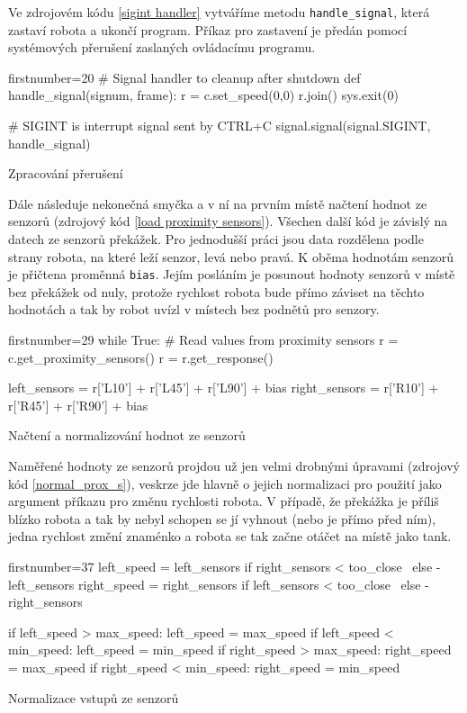 \documentclass[12pt,notitlepage]{report}
\newcommand{\code}[1]{\texttt{\small #1}}
\begin{document}
Ve zdrojovém kódu \ref{sigint handler} vytváříme metodu \code{handle\_signal},
která zastaví robota a ukončí program. Příkaz pro zastavení je předán pomocí
systémových přerušení zaslaných ovládacímu programu.

\begin{listing}[H]
\begin{pyc*}{firstnumber=20}
# Signal handler to cleanup after shutdown
def handle_signal(signum, frame):
    r = c.set_speed(0,0)
    r.join()
    sys.exit(0)

# SIGINT is interrupt signal sent by CTRL+C
signal.signal(signal.SIGINT, handle_signal)
\end{pyc*}
\caption{Zpracování přerušení}
\label{sigint handler}
\end{listing}

Dále následuje nekonečná smyčka a v ní na prvním místě načtení hodnot ze
senzorů (zdrojový kód  \ref{load proximity sensors}). Všechen další kód je
závislý na datech ze senzorů překážek. Pro jednodušší práci jsou data rozdělena
podle strany robota, na které leží senzor, levá nebo pravá. K oběma hodnotám
senzorů je přičtena proměnná \code{bias}. Jejím posláním je posunout hodnoty
senzorů v místě bez překážek od nuly, protože rychlost robota bude přímo
záviset na těchto hodnotách a tak by robot uvízl v místech bez podnětů pro
senzory.

\begin{listing}[H]
\begin{pyc*}{firstnumber=29}
while True:
    # Read values from proximity sensors
    r = c.get_proximity_sensors()
    r = r.get_response()

    left_sensors = r['L10'] + r['L45'] + r['L90'] + bias
    right_sensors = r['R10'] + r['R45'] + r['R90'] + bias
\end{pyc*}
\caption{Načtení a normalizování hodnot ze senzorů}
\label{load proximity sensors}
\end{listing}

Naměřené hodnoty ze senzorů projdou už jen velmi drobnými úpravami (zdrojový
kód \ref{normal_prox_s}), veskrze jde hlavně o jejich
normalizaci pro použití jako argument příkazu pro změnu rychlosti robota. V
případě, že překážka je příliš blízko robota a tak by nebyl schopen se jí
vyhnout (nebo je přímo před ním), jedna rychlost změní znaménko a robota se tak
začne otáčet na místě jako tank.

\begin{listing}[H]
\begin{pyc*}{firstnumber=37}
    left_speed = left_sensors if right_sensors < too_close \
                 else -left_sensors
    right_speed = right_sensors if left_sensors < too_close \
                  else -right_sensors

    if left_speed > max_speed: left_speed = max_speed
    if left_speed < min_speed: left_speed = min_speed
    if right_speed > max_speed: right_speed = max_speed
    if right_speed < min_speed: right_speed = min_speed
\end{pyc*}
\caption{Normalizace vstupů ze senzorů}
\label{normal_prox_s}
\end{listing}
\end{document}
